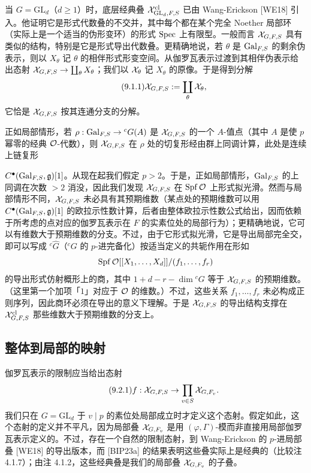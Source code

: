 当 $G=\mathrm{GL}_d$（$d\ge1$）时，底层经典叠 $\mathcal{X}^{\mathrm{cl}}_{\mathrm{GL}_d,F,S}$ 已由 Wang-Erickson [WE18] 引入。他证明它是形式代数叠的不交并，其中每个都在某个完全 Noether 局部环（实际上是一个适当的伪形变环）的形式 $\operatorname{Spec}$ 上有限型。一般而言 $\mathcal{X}_{G,F,S}$ 具有类似的结构，特别是它是形式导出代数叠。更精确地说，若 $\theta$ 是 $\operatorname{Gal}_{F,S}$ 的剩余伪表示，则以 $X_\theta$ 记 $\theta$ 的相伴形式形变空间。从伽罗瓦表示过渡到其相伴伪表示给出态射 $\mathcal{X}_{G,F,S}\to\coprod_\theta X_\theta$；我们以 $\mathcal{X}_\theta$ 记 $X_\theta$ 的原像。于是得到分解
\begin{equation}\tag{9.1.1}\label{eq:a4-9-1-1}
\mathcal{X}_{G,F,S}:=\coprod_\theta\mathcal{X}_\theta,
\end{equation}
它恰是 $\mathcal{X}_{G,F,S}$ 按其连通分支的分解。

正如局部情形，若 $\rho:\operatorname{Gal}_{F,S}\to{}^cG(A)$ 是 $\mathcal{X}_{G,F,S}$ 的一个 $A$-值点（其中 $A$ 是使 $p$ 幂零的经典 $\mathcal{O}$-代数），则 $\mathcal{X}_{G,F,S}$ 在 $\rho$ 处的切复形经由群上同调计算，此处是连续上链复形

$C^\bullet(\operatorname{Gal}_{F,S},\mathfrak g)[1]$。从现在起我们假定 $p>2$。于是，正如局部情形，$\operatorname{Gal}_{F,S}$ 的上同调在次数 $>2$ 消没，因此我们发现 $\mathcal{X}_{G,F,S}$ 在 $\operatorname{Spf}\mathcal{O}$ 上形式拟光滑。然而与局部情形不同，$\mathcal{X}_{G,F,S}$ 未必具有其预期维数（某点处的预期维数可以用 $C^\bullet(\operatorname{Gal}_{F,S},\mathfrak g)[1]$ 的欧拉示性数计算，后者由整体欧拉示性数公式给出，因而依赖于所考虑的点对应的伽罗瓦表示在 $F$ 的实素位处的局部行为）；更精确地说，它可以有维数大于预期维数的分支。不过，由于它形式拟光滑，它是导出局部完全交，即可以写成 ${}^c\widehat G$（${}^cG$ 的 $p$-进完备化）按适当定义的共轭作用在形如
\[
\operatorname{Spf}\mathcal{O}[[X_1,\dots,X_d]]/(f_1,\dots,f_r)
\]
的导出形式仿射概形上的商，其中 $1+d-r-\dim{}^cG$ 等于 $\mathcal{X}_{G,F,S}$ 的预期维数。（这里第一个加项「$1$」对应于 $\mathcal{O}$ 的维数。）不过，这些关系 $f_1,\dots,f_r$ 未必构成正则序列，因此商环必须在导出的意义下理解。于是 $\mathcal{X}_{G,F,S}$ 的导出结构支撑在 $\mathcal{X}^{\mathrm{cl}}_{G,F,S}$ 那些维数大于预期维数的分支上。

\subsection{整体到局部的映射}
伽罗瓦表示的限制应当给出态射
\begin{equation}\tag{9.2.1}\label{eq:a4-9-2-1}
f:\mathcal{X}_{G,F,S}\to\prod_{v\in S}\mathcal{X}_{G,F_v}.
\end{equation}
我们只在 $G=\mathrm{GL}_d$ 于 $v\mid p$ 的素位处局部成立时才定义这个态射。假定如此，这个态射的定义并不平凡，因为局部叠 $\mathcal{X}_{G,F_v}$ 是用 $(\varphi,\Gamma)$-模而非直接用局部伽罗瓦表示定义的。不过，存在一个自然的限制态射，到 Wang-Erickson 的 $p$-进局部叠 [WE18] 的导出版本，而 [BIP23a] 的结果表明这些叠实际上是经典的（比较注 4.1.7）；由注 4.1.2，这些经典叠是我们的局部叠 $\mathcal{X}_{G,F_v}$ 的子叠。


